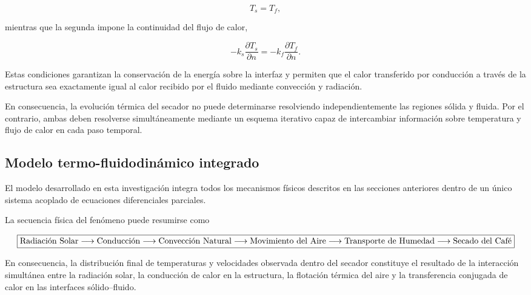\begin{equation}
T_s=T_f,
\end{equation}

mientras que la segunda impone la continuidad del flujo de calor,

\begin{equation}
-k_s
\frac{\partial T_s}{\partial n}
=
-k_f
\frac{\partial T_f}{\partial n}.
\end{equation}

Estas condiciones garantizan la conservación de la energía sobre la interfaz y permiten que el calor transferido por conducción a través de la estructura sea exactamente igual al calor recibido por el fluido mediante convección y radiación.

En consecuencia, la evolución térmica del secador no puede determinarse resolviendo independientemente las regiones sólida y fluida. Por el contrario, ambas deben resolverse simultáneamente mediante un esquema iterativo capaz de intercambiar información sobre temperatura y flujo de calor en cada paso temporal.

\subsection{Modelo termo-fluidodinámico integrado}

El modelo desarrollado en esta investigación integra todos los mecanismos físicos descritos en las secciones anteriores dentro de un único sistema acoplado de ecuaciones diferenciales parciales.

La secuencia física del fenómeno puede resumirse como

\[
\boxed{
\text{Radiación Solar}\\

\longrightarrow
\text{Conducción}\\
\longrightarrow
\text{Convección Natural}\\
\longrightarrow
\text{Movimiento del Aire}\\
\longrightarrow
\text{Transporte de Humedad}\\
\longrightarrow
\text{Secado del Café}\\
}
\]

En consecuencia, la distribución final de temperaturas y velocidades observada dentro del secador constituye el resultado de la interacción simultánea entre la radiación solar, la conducción de calor en la estructura, la flotación térmica del aire y la transferencia conjugada de calor en las interfaces sólido--fluido.

